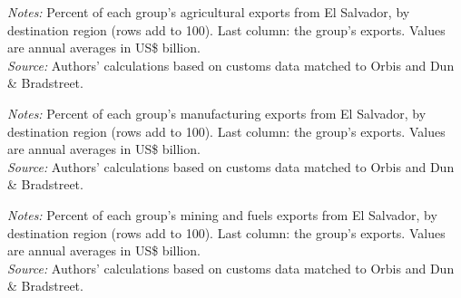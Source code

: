 \documentclass[11pt,a4paper]{article}
\begin{document}
\begin{table}[H]\centering\small%
  \caption{El Salvador, Agriculture: Multinational Exports by Parent Region and Destination Region}%
  \label{tab:c_reg_SLV_agro}%
  \par\vspace{3pt}%
  \begin{minipage}{0.95\textwidth}\footnotesize %
  \textit{Notes:} Percent of each group's agricultural exports from El Salvador, by destination region (rows add to 100). Last column: the group's exports. Values are annual averages in US\$ billion.\\[3pt]%
  \textit{Source:} Authors' calculations based on customs data matched to Orbis and Dun \& Bradstreet.%
  \end{minipage}%
  \end{table}
\begin{table}[H]\centering\small%
  \caption{El Salvador, Manufacturing: Multinational Exports by Parent Region and Destination Region}%
  \label{tab:c_reg_SLV_manufacturing}%
  \par\vspace{3pt}%
  \begin{minipage}{0.95\textwidth}\footnotesize %
  \textit{Notes:} Percent of each group's manufacturing exports from El Salvador, by destination region (rows add to 100). Last column: the group's exports. Values are annual averages in US\$ billion.\\[3pt]%
  \textit{Source:} Authors' calculations based on customs data matched to Orbis and Dun \& Bradstreet.%
  \end{minipage}%
  \end{table}
\begin{table}[H]\centering\small%
  \caption{El Salvador, Mining and Fuels: Multinational Exports by Parent Region and Destination Region}%
  \label{tab:c_reg_SLV_mining}%
  \par\vspace{3pt}%
  \begin{minipage}{0.95\textwidth}\footnotesize %
  \textit{Notes:} Percent of each group's mining and fuels exports from El Salvador, by destination region (rows add to 100). Last column: the group's exports. Values are annual averages in US\$ billion.\\[3pt]%
  \textit{Source:} Authors' calculations based on customs data matched to Orbis and Dun \& Bradstreet.%
  \end{minipage}%
  \end{table}
\end{document}
